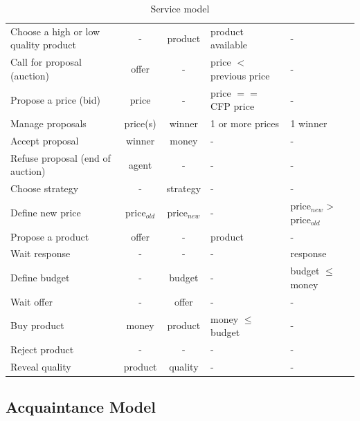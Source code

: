 \documentclass[a4paper,11pt]{report}
\begin{document}
  \begin{table}[ht!]
  \centering
  \begin{tabularx}{\linewidth}{@{}|L{2.0}|C{0.4}|C{0.4}|L{1.2}|L{1}|@{}}
   &  &  &  &  \\\hline
  Choose a high or low quality product & - & product & product available & - \\ \hline
  Call for proposal (auction) & offer & - & price $<$ previous price & - \\ \hline
  Propose a price (bid) & price & - & price $==$ CFP price & - \\ \hline
  Manage proposals & price(s) & winner & 1 or more prices & 1 winner \\ \hline
  Accept proposal & winner & money & - & - \\ \hline
  Refuse proposal (end of auction) & agent & - & - & - \\ \hline
  Choose strategy & - & strategy & - & - \\ \hline
  Define new price & price$_{old}$ & price$_{new}$ & - & price$_{new} >$ price$_{old}$ \\ \hline
  Propose a product & offer & - & product & - \\ \hline
  Wait response & - & - & - & response \\ \hline
  Define budget & - & budget & - & budget $\leq$ money \\ \hline
  Wait offer & - & offer & - & - \\ \hline
  Buy product & money & product & money $\leq$ budget & - \\ \hline
  Reject product & - & - & - & - \\ \hline
  Reveal quality & product & quality & - & - \\ \hline
  
  
  \end{tabularx}
  
  \caption{Service model}
  \label{table:service_model}
  \end{table}
  \restoregeometry
  
  
  \subsection{Acquaintance Model}
  
\end{document}
